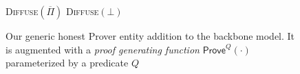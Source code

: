 \begin{figure}[t]
\begin{algorithm}[H]
    \caption{\label{alg.backbone-prover} Our generic honest Prover entity addition to the
        backbone model. It is augmented with a{ \em
        proof generating function} $\textsf{Prove}^Q(\cdot)$ parameterized by a
        predicate $Q$}
    \begin{algorithmic}[1]
     \Statex
     \Let\chain\varepsilon
                \State\textsc{Diffuse}{$(\overline \Pi)$}
            \Else
                \State\textsc{Diffuse}{$(\bot)$}
            \EndIf
        \EndWhile
        \vskip8pt
    \end{algorithmic}
\end{algorithm}
\end{figure}
